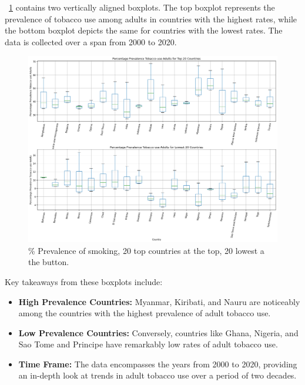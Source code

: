             \figurename~\ref{fig:du-smoking-countries-top-lw-20} contains two vertically aligned boxplots. The top boxplot represents the prevalence of tobacco use among adults in countries with the highest rates, while the bottom boxplot depicts the same for countries with the lowest rates. The data is collected over a span from 2000 to 2020.

            \begin{figure}[H]
                \centering
                \includegraphics[scale=0.4]{images/du_smoking_pr_sm_cou_t_l_20}
                \caption{\% Prevalence of smoking, 20 top countries at the top, 20 lowest a the button.}
                \label{fig:du-smoking-countries-top-lw-20}
            \end{figure}

            Key takeaways from these boxplots include:

            \begin{itemize}
                \item \textbf{High Prevalence Countries:} Myanmar, Kiribati, and Nauru are noticeably among the countries with the highest prevalence of adult tobacco use.

                \item \textbf{Low Prevalence Countries:} Conversely, countries like Ghana, Nigeria, and Sao Tome and Principe have remarkably low rates of adult tobacco use.

                \item \textbf{Time Frame:} The data encompasses the years from 2000 to 2020, providing an in-depth look at trends in adult tobacco use over a period of two decades.
            \end{itemize}

